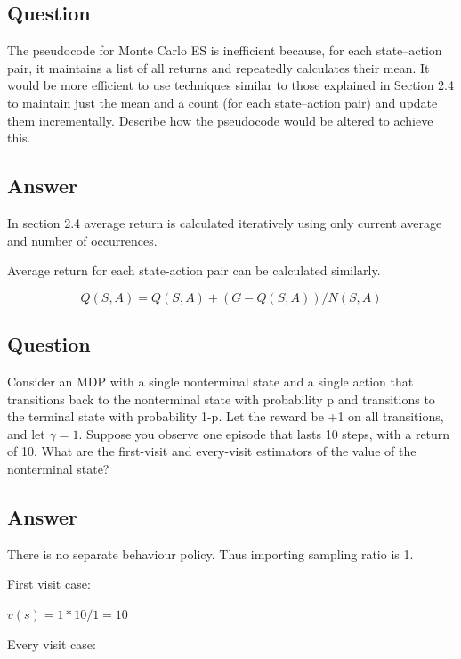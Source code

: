 \documentclass[11pt]{article}
\begin{document}
    \subsection{Question}

    The pseudocode for Monte Carlo ES is inefficient because, for each state–action pair, it maintains a list of all returns and repeatedly calculates their mean.
    It would be more efficient to use techniques similar to those explained in Section 2.4 to maintain just the mean and a count (for each state–action pair) and update them incrementally.
    Describe how the pseudocode would be altered to achieve this.

    \subsection*{Answer}

    In section 2.4 average return is calculated iteratively using only current average and number of occurrences.

    Average return for each state-action pair can be calculated similarly.

    \begin{equation}
        Q(S,A) = Q(S,A) + (G - Q(S,A)) / N(S,A)
    \end{equation}

    \subsection{Question}

    Consider an MDP with a single nonterminal state and a single action that transitions back to the nonterminal state with probability p and transitions to the terminal state with probability 1-p.
    Let the reward be +1 on all transitions, and let $\gamma=1$.
    Suppose you observe one episode that lasts 10 steps, with a return of 10.
    What are the first-visit and every-visit estimators of the value of the nonterminal state?

    \subsection*{Answer}

    There is no separate behaviour policy.
    Thus importing sampling ratio is 1.

    First visit case:

    $ v(s) = 1 * 10 / 1 =  10 $

    Every visit case:
\end{document}
